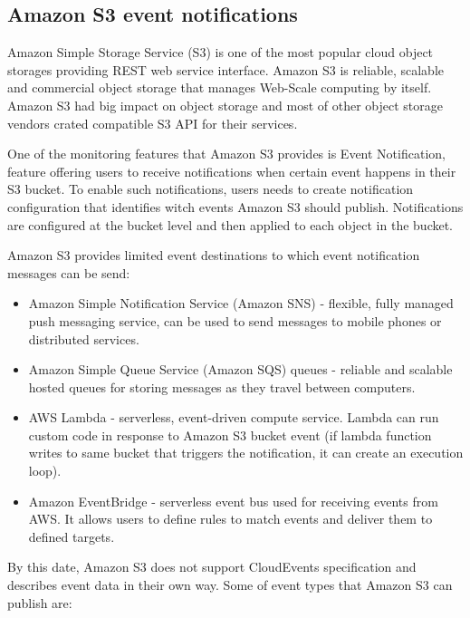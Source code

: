     \subsection{Amazon S3 event notifications}
     Amazon Simple Storage Service (S3) is one of the most popular cloud object storages providing REST web service interface. Amazon S3 is reliable, scalable and commercial object storage that manages Web-Scale computing by itself\cite{eventS3}. Amazon S3 had big impact on object storage and most of other object storage vendors crated compatible S3 API for their services.

     One of the monitoring features that Amazon S3 provides is Event Notification, feature offering users to receive notifications when certain event happens in their S3 bucket. To enable such notifications, users needs to create notification configuration that identifies witch events Amazon S3 should publish\cite{eventS3EventNotification}. Notifications are configured at the bucket level and then applied to each object in the bucket.

     Amazon S3 provides limited event destinations to which event notification messages can be send\cite{eventS3EventNotificationDest}:
     \begin{itemize}
         \item Amazon Simple Notification Service (Amazon SNS) - flexible, fully managed push messaging service, can be used to send messages to mobile phones or distributed services.
         \item Amazon Simple Queue Service (Amazon SQS) queues - reliable and scalable hosted queues for storing messages as they travel between computers.
         \item AWS Lambda - serverless, event-driven compute service. Lambda can run custom code in response to Amazon S3 bucket event (if lambda function writes to same bucket that triggers the notification, it can create an execution loop).
         \item Amazon EventBridge - serverless event bus used for receiving events from AWS. It allows users to define rules to match events and deliver them to defined targets.
     \end{itemize}

     By this date, Amazon S3 does not support CloudEvents specification and describes event data in their own way. Some of event types that Amazon S3 can publish are\cite{eventS3EventNotificationDest}:


